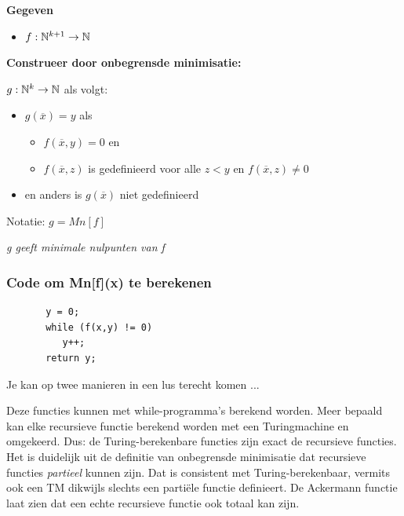 {\bf Gegeven}
\begin{itemize}
\item $f: \mathbb{N}^{k+1} \rightarrow \mathbb{N}$
\end{itemize}

{\bf Construeer door onbegrensde minimisatie:}

$g: \mathbb{N}^k \rightarrow \mathbb{N}$ als volgt:

\begin{itemize}
\item[] $g(\overline{x}) = y$ als
\begin{itemize}
\item[] $f(\overline{x},y) = 0$ en
\item[] $f(\overline{x},z)$ is gedefinieerd voor alle $z < y$ en
$f(\overline{x},z) \neq 0$
\end{itemize}
\item[] en anders is $g(\overline{x})$ niet gedefinieerd
\end{itemize}


Notatie: $g = Mn[f]$


{\em g geeft minimale nulpunten van f}

\subsubsection{Code om Mn[f](x) te berekenen}


\begin{verbatim}
       y = 0;
       while (f(x,y) != 0)
          y++;
       return y;
\end{verbatim}

Je kan op twee manieren in een lus terecht komen ...





Deze functies kunnen met while-programma's berekend worden. Meer
bepaald kan elke recursieve functie berekend worden met een
Turingmachine en omgekeerd. Dus: de Turing-berekenbare functies zijn
exact de recursieve functies. Het is duidelijk uit de definitie van
onbegrensde minimisatie dat recursieve functies {\em partieel} kunnen
zijn. Dat is consistent met Turing-berekenbaar, vermits ook een TM
dikwijls slechts een parti\"ele functie definieert. De Ackermann functie
laat zien dat een echte recursieve functie ook totaal kan zijn.


